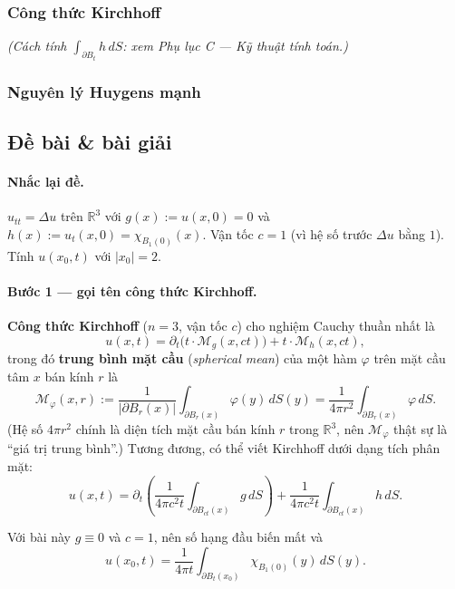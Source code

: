 \subsubsection*{Công thức Kirchhoff}

\emph{(Cách tính $\int_{\partial B_t}h\,dS$: xem Phụ lục C --- Kỹ thuật tính toán.)}

\subsubsection*{Nguyên lý Huygens mạnh}


\subsection*{Đề bài \& bài giải}
\paragraph{Nhắc lại đề.} $u_{tt}=\Delta u$ trên $\mathbb{R}^3$ với $g(x):=u(x,0)=0$ và $h(x):=u_t(x,0)=\chi_{B_1(0)}(x)$. Vận tốc $c=1$ (vì hệ số trước $\Delta u$ bằng $1$). Tính $u(x_0,t)$ với $|x_0|=2$.

\paragraph{Bước 1 --- gọi tên công thức Kirchhoff.}\leavevmode

\textbf{Công thức Kirchhoff} ($n=3$, vận tốc $c$) cho nghiệm Cauchy thuần nhất là
\[
  u(x,t)=\partial_t\!\Big(t\cdot \mathcal{M}_g(x,ct)\Big)+t\cdot \mathcal{M}_h(x,ct),
\]
trong đó \textbf{trung bình mặt cầu} (\emph{spherical mean}) của một hàm $\varphi$ trên mặt cầu tâm $x$ bán kính $r$ là
\[
  \mathcal{M}_\varphi(x,r):=\frac{1}{|\partial B_r(x)|}\int_{\partial B_r(x)}\!\varphi(y)\,dS(y)
  =\frac{1}{4\pi r^2}\int_{\partial B_r(x)}\!\varphi\,dS.
\]
(Hệ số $4\pi r^2$ chính là diện tích mặt cầu bán kính $r$ trong $\mathbb{R}^3$, nên $\mathcal{M}_\varphi$ thật sự là ``giá trị trung bình''.) Tương đương, có thể viết Kirchhoff dưới dạng tích phân mặt:
\[
  u(x,t)=\partial_t\!\left(\frac{1}{4\pi c^2 t}\!\int_{\partial B_{ct}(x)}\! g\,dS\right)+\frac{1}{4\pi c^2 t}\!\int_{\partial B_{ct}(x)}\! h\,dS.
\]

Với bài này $g\equiv 0$ và $c=1$, nên số hạng đầu biến mất và
\[
  u(x_0,t)=\frac{1}{4\pi t}\int_{\partial B_t(x_0)}\!\chi_{B_1(0)}(y)\,dS(y).
\]

